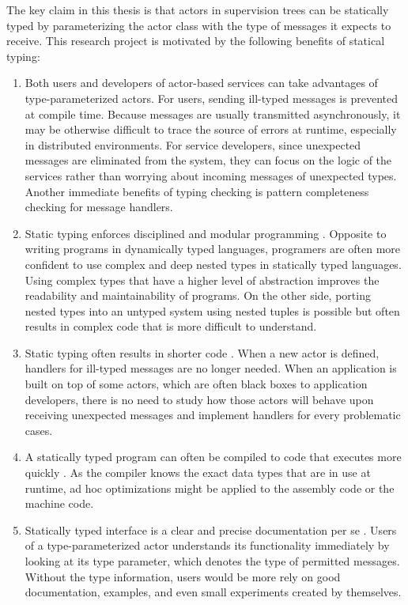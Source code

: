 The key claim in this thesis is that actors in supervision trees can be 
statically typed by parameterizing the actor class with the type of messages it 
expects to receive.  This research project is motivated by the following benefits of statical typing:
\begin{enumerate}
  \item Both users and developers of actor-based services can take advantages 
of type-parameterized actors.  For users, sending ill-typed messages is 
prevented at compile time.  Because messages are usually transmitted 
asynchronously, it may be otherwise difficult to trace the source of errors at 
runtime, especially in distributed environments.  For service developers, since 
unexpected messages are eliminated from the system, they can focus on the 
logic of the services rather than worrying about incoming messages of 
unexpected types.  Another immediate benefits of typing checking is pattern
completeness checking for message handlers.
  \item Static typing enforces disciplined and modular programming \citep{TPL}.
Opposite to writing programs in dynamically typed languages, programers are often more confident to use complex and deep nested types in statically typed languages.  Using complex types that have a higher level of abstraction improves the readability and maintainability of programs.  On the other side, porting nested types into an untyped system using nested tuples is possible but often results in complex code that is more difficult to understand.
  \item Static typing often results in shorter code \citep{TPL}.  When a new actor is defined, handlers for ill-typed messages are no longer needed.  When an application is built on top of some actors, which are often black boxes to application developers, there is no need to study how those actors will behave upon receiving unexpected messages and implement handlers for every problematic cases.
  \item A statically typed program can often be compiled to code that executes more quickly \citep{TPL}.  As the compiler knows the exact data types that are in use at runtime, ad hoc optimizations might be applied to the assembly code or the machine code.
  \item Statically typed interface is a clear and precise documentation per se \citep{TPL}.  Users of a type-parameterized actor understands its functionality immediately by looking at its type parameter, which denotes the type of permitted messages.  Without the type information, users would be more rely on good documentation, examples, and even small experiments created by themselves\citep{endrikat2014api}.

\end{enumerate}


